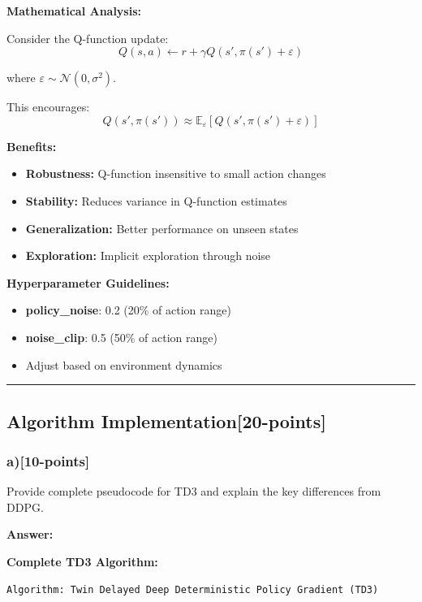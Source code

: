 \documentclass[12pt]{article}
\begin{document}
{{\textbf{Mathematical Analysis:}

Consider the Q-function update:
\begin{equation}
Q(s,a) \leftarrow r + \gamma Q(s', \pi(s') + \varepsilon)
\end{equation}

where $\varepsilon \sim \mathcal{N}(0, \sigma^2)$.

This encourages:
\begin{equation}
Q(s', \pi(s')) \approx \mathbb{E}_\varepsilon[Q(s', \pi(s') + \varepsilon)]
\end{equation}

\textbf{Benefits:}
\begin{itemize}
\item \textbf{Robustness:} Q-function insensitive to small action changes
\item \textbf{Stability:} Reduces variance in Q-function estimates
\item \textbf{Generalization:} Better performance on unseen states
\item \textbf{Exploration:} Implicit exploration through noise
\end{itemize}

\textbf{Hyperparameter Guidelines:}
\begin{itemize}
\item \textbf{policy\_noise}: 0.2 (20\% of action range)
\item \textbf{noise\_clip}: 0.5 (50\% of action range)
\item Adjust based on environment dynamics
\end{itemize}

\noindent\rule{\textwidth}{0.2pt}

\subsection{Algorithm Implementation[20-points]}
\subsubsection{a)[10-points]} Provide complete pseudocode for TD3 and explain the key differences from DDPG.

\textbf{Answer:}

\textbf{Complete TD3 Algorithm:}

\begin{verbatim}
Algorithm: Twin Delayed Deep Deterministic Policy Gradient (TD3)


\end{verbatim}}}
\end{document}
